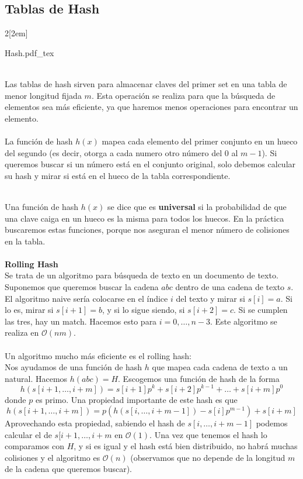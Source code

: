 \documentclass{myclass}
\newcommand{\incfig}[1]{%
  \begin{center}
  \def\svgwidth{0.9\columnwidth}
  {#1.pdf_tex}
  \end{center}
}
\begin{document}
\subsection{Tablas de Hash}
\begin{multicols}{2}[\columnsep2em]
\incfig{Hash} 
\columnbreak \\
Las tablas de hash sirven para almacenar claves del primer set en una tabla de menor longitud fijada $m$. Esta operación se realiza para que la búsqueda de elementos sea más eficiente, ya que haremos menos operaciones para encontrar un elemento. \\
\\
La función de hash  $h(x)$ mapea cada elemento del primer conjunto en un hueco del segundo (es decir, otorga a cada numero otro número del $0$ al  $m-1$). Si queremos buscar si un número está en el conjunto original, solo debemos calcular su hash y mirar si está en el hueco de la tabla correspondiente. \\
\end{multicols}
\\
\noindent
Una función de hash $h(x)$ se dice que es  \textbf{universal} si la probabilidad de que una clave caiga en un hueco es la misma para todos los huecos. En la práctica buscaremos estas funciones, porque nos aseguran el menor número de colisiones en la tabla.\\
\\
\textbf{Rolling Hash}\\
Se trata de un algoritmo para búsqueda de texto en un documento de texto. Suponemos que queremos buscar la cadena $abc$ dentro de una cadena de texto $s$. El algoritmo naive sería colocarse en el índice $i$ del texto y mirar si $s[i]=a$. Si lo es, mirar si $s[i+1]=b$, y si lo sigue siendo, si $s[i+2]=c$. Si se cumplen las tres, hay un match. Hacemos esto para $i = 0, \ldots , n-3$. Este algoritmo se realiza en $\mathcal{O}(nm)$.\\
\\
Un algoritmo mucho más eficiente es el rolling hash:\\
Nos ayudamos de una función de hash $h$ que mapea cada cadena de texto a un natural. Hacemos $h(abc)=H$. Escogemos una función de hash de la forma
\[
h(s[i+1,\ldots, i+m]) = s[i+1]p^k + s[i+2]p^{k-1} + \ldots + s[i+m]p^0
\] 
donde $p$ es primo. Una propiedad importante de este hash es que 
\[
h(s[i+1, \ldots, i+m]) = p(h(s[i, \ldots, i+m-1])-s[i]p^{m-1}) + s[i+m]
\]
Aprovechando esta propiedad, sabiendo el hash de $s[i, \ldots, i+m-1]$ podemos calcular el de  $s[i+1, \ldots, i+m$ en $\mathcal{O}(1)$. Una vez que tenemos el hash lo comparamos con $H$, y si es igual y el hash está bien distribuido, no habrá muchas colisiones y el algoritmo es  $\mathcal{O}(n)$ (observamos que no depende de la longitud $m$ de la cadena que queremos buscar). \\
\end{document}

